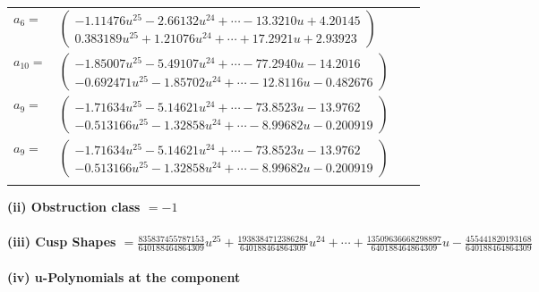 \documentclass[1p]{elsarticle_modified}
\theoremstyle{definition}
\begin{document}
\begin{tabular}{m{7pt} m{180pt} m{7pt} m{180pt} }
\flushright $a_{6}=$&$\begin{pmatrix}-1.11476 u^{25}-2.66132 u^{24}+\cdots-13.3210 u+4.20145\\0.383189 u^{25}+1.21076 u^{24}+\cdots+17.2921 u+2.93923\end{pmatrix}$ \\
\flushright $a_{10}=$&$\begin{pmatrix}-1.85007 u^{25}-5.49107 u^{24}+\cdots-77.2940 u-14.2016\\-0.692471 u^{25}-1.85702 u^{24}+\cdots-12.8116 u-0.482676\end{pmatrix}$ \\
\flushright $a_{9}=$&$\begin{pmatrix}-1.71634 u^{25}-5.14621 u^{24}+\cdots-73.8523 u-13.9762\\-0.513166 u^{25}-1.32858 u^{24}+\cdots-8.99682 u-0.200919\end{pmatrix}$\\ \flushright $a_{9}=$&$\begin{pmatrix}-1.71634 u^{25}-5.14621 u^{24}+\cdots-73.8523 u-13.9762\\-0.513166 u^{25}-1.32858 u^{24}+\cdots-8.99682 u-0.200919\end{pmatrix}$\\&\end{tabular}
\flushleft \textbf{(ii) Obstruction class $= -1$}\\~\\
\flushleft \textbf{(iii) Cusp Shapes $= \frac{835837455787153}{640188464864309} u^{25}+\frac{1938384712386284}{640188464864309} u^{24}+\cdots+\frac{13509636668298897}{640188464864309} u-\frac{455441820193168}{640188464864309}$}\\~\\
\newpage\renewcommand{\arraystretch}{1}
\flushleft \textbf{(iv) u-Polynomials at the component}\newline \\
\end{document}
